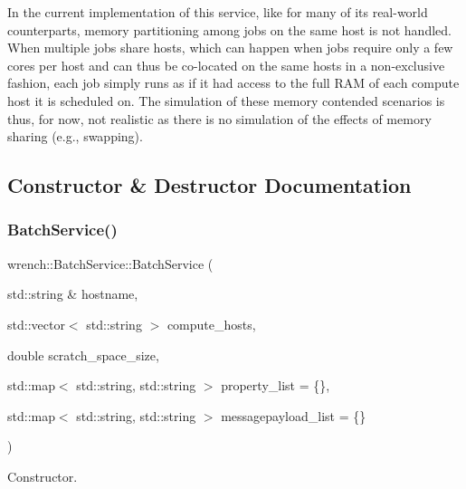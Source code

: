 In the current implementation of this service, like for many of its real-\/world counterparts, memory partitioning among jobs on the same host is not handled. When multiple jobs share hosts, which can happen when jobs require only a few cores per host and can thus be co-\/located on the same hosts in a non-\/exclusive fashion, each job simply runs as if it had access to the full R\+AM of each compute host it is scheduled on. The simulation of these memory contended scenarios is thus, for now, not realistic as there is no simulation of the effects of memory sharing (e.\+g., swapping). 

\subsection{Constructor \& Destructor Documentation}
\mbox{\label{classwrench_1_1_batch_service_a2f91405c977001fa52acda0fe849f143}} 
\subsubsection{\texorpdfstring{Batch\+Service()}{BatchService()}}
{\footnotesize\ttfamily wrench\+::\+Batch\+Service\+::\+Batch\+Service (\begin{DoxyParamCaption}\item[{std\+::string \&}]{hostname,  }\item[{std\+::vector$<$ std\+::string $>$}]{compute\+\_\+hosts,  }\item[{double}]{scratch\+\_\+space\+\_\+size,  }\item[{std\+::map$<$ std\+::string, std\+::string $>$}]{property\+\_\+list = {\ttfamily \{\}},  }\item[{std\+::map$<$ std\+::string, std\+::string $>$}]{messagepayload\+\_\+list = {\ttfamily \{\}} }\end{DoxyParamCaption})}



Constructor. 


